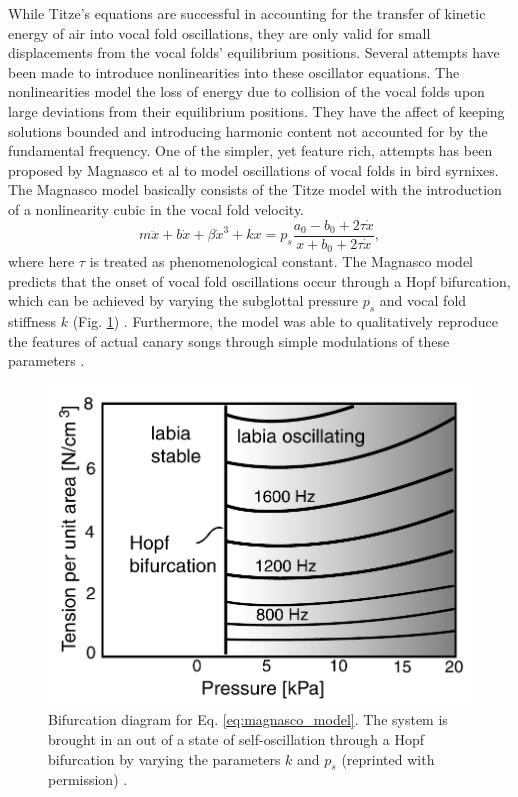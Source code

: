 \documentclass[12pt, letter]{report}
\begin{document}
While Titze's equations are successful in accounting for the transfer of kinetic energy of air into vocal fold oscillations, they are only valid for small displacements from the vocal folds' equilibrium positions. Several attempts have been made to introduce nonlinearities into these oscillator equations. The nonlinearities model the loss of energy due to collision of the vocal folds upon large deviations from their equilibrium positions. They have the affect of keeping solutions bounded and introducing harmonic content not accounted for by the fundamental frequency. One of the simpler, yet feature rich, attempts has been proposed by Magnasco et al to model oscillations of vocal folds in bird syrnixes. The Magnasco model basically consists of the Titze model with the introduction of a nonlinearity cubic in the vocal fold velocity.
\begin{equation} 
\label{eq:magnasco_model}
m \ddot{x} + b \dot{x} + \beta \dot{x}^3 + k x = p_s \frac{a_0 - b_0 + 2 \tau \dot{x}}{x + b_0 + 2 \tau \dot{x}},
\end{equation}
where here $\tau$ is treated as phenomenological constant. The Magnasco model predicts that the onset of vocal fold oscillations occur through a Hopf bifurcation, which can be achieved by varying the subglottal pressure $p_s$ and vocal fold stiffness $k$ (Fig. \ref{fig:magnasco_hopf}) \cite{Gardner2001}. Furthermore, the model was able to qualitatively reproduce the features of actual canary songs through simple modulations of these parameters  \cite{Gardner2001}.
\begin{figure}
\centering
\includegraphics[width=0.5\linewidth]{magnasco_hopf.png}
\caption{Bifurcation diagram for Eq. \ref{eq:magnasco_model}. The system is brought in an out of a state of self-oscillation through a Hopf bifurcation by varying the parameters $k$ and $p_s$ (reprinted with permission) \cite{Gardner2001}.}
\label{fig:magnasco_hopf}
\end{figure}
\end{document}
